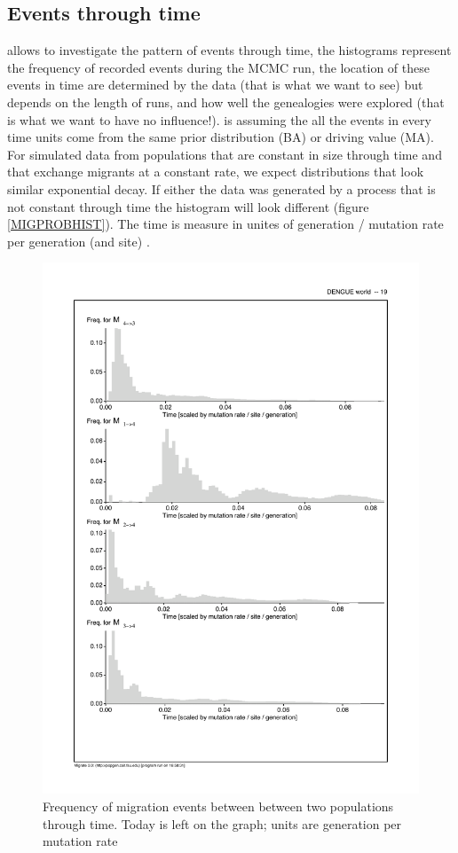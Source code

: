 \subsection{Events through time}
\migrate allows to investigate the pattern of events through time, the histograms represent the frequency of recorded events during the MCMC run, the location of these events in time are determined by the data (that is what we want to see) but depends on the length of runs, and how well the genealogies were explored (that is what we want to have no influence!). \migrate is assuming the all the events in every time units come from the same prior distribution (BA) or driving value (MA). For simulated data from populations that are constant in size through time and that exchange migrants at a constant rate, we expect distributions that look similar exponential decay. If either the data was generated by a process that is not constant through time the histogram will look different (figure \ref{MIGPROBHIST}). The time is measure in unites of generation / mutation rate per generation (and site) .
\begin{figure}[htb]
\begin{center}
\includegraphics[scale=0.8]{mim/frequencyM}
\end{center}
\caption{Frequency of migration events between between two populations through time. Today is left on the graph; units are generation per mutation rate 
\label{MIGPROB}}
\end{figure}
